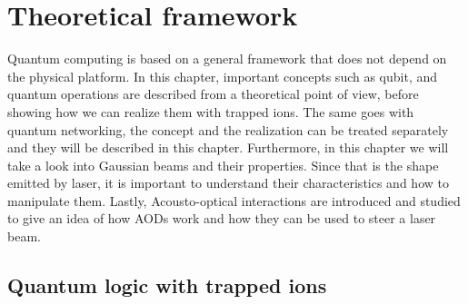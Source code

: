 
\chapter{Theoretical framework}
Quantum computing is based on a general framework that does not depend on the physical platform. In this chapter, important concepts such as qubit, and quantum operations are described from a theoretical point of view, before showing how we can realize them with trapped ions. The same goes with quantum networking, the concept and the realization can be treated separately and they will be described in this chapter. Furthermore, in this chapter we will take a look into Gaussian beams and their properties. Since that is the shape emitted by laser, it is important to understand their characteristics and how to manipulate them. Lastly, Acousto-optical interactions are introduced and studied to give an idea of how AODs work and how they can be used to steer a laser beam.
\section{Quantum logic with trapped ions}
